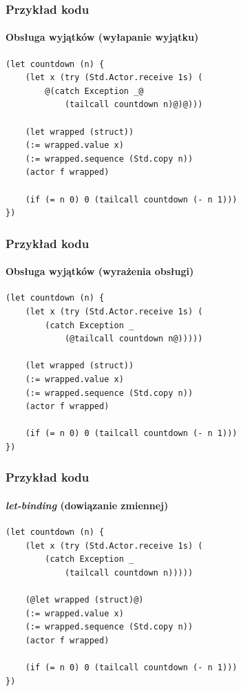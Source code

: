\documentclass[aspectratio=169]{beamer}
\begin{document}
\begin{frame}[fragile]
    \frametitle{Przykład kodu}
    \framesubtitle{Obsługa wyjątków (wyłapanie wyjątku)}

    \begin{small}
    \begin{lstlisting}
(let countdown (n) {
    (let x (try (Std.Actor.receive 1s) (
        @(catch Exception _@
            (tailcall countdown n)@)@)))

    (let wrapped (struct))
    (:= wrapped.value x)
    (:= wrapped.sequence (Std.copy n))
    (actor f wrapped)

    (if (= n 0) 0 (tailcall countdown (- n 1)))
})
    \end{lstlisting}
    \end{small}
\end{frame}

\begin{frame}[fragile]
    \frametitle{Przykład kodu}
    \framesubtitle{Obsługa wyjątków (wyrażenia obsługi)}

    \begin{small}
    \begin{lstlisting}
(let countdown (n) {
    (let x (try (Std.Actor.receive 1s) (
        (catch Exception _
            (@tailcall countdown n@)))))

    (let wrapped (struct))
    (:= wrapped.value x)
    (:= wrapped.sequence (Std.copy n))
    (actor f wrapped)

    (if (= n 0) 0 (tailcall countdown (- n 1)))
})
    \end{lstlisting}
    \end{small}
\end{frame}

\begin{frame}[fragile]
    \frametitle{Przykład kodu}
    \framesubtitle{\emph{let-binding} (dowiązanie zmiennej)}

    \begin{small}
    \begin{lstlisting}
(let countdown (n) {
    (let x (try (Std.Actor.receive 1s) (
        (catch Exception _
            (tailcall countdown n)))))

    (@let wrapped (struct)@)
    (:= wrapped.value x)
    (:= wrapped.sequence (Std.copy n))
    (actor f wrapped)

    (if (= n 0) 0 (tailcall countdown (- n 1)))
})
    \end{lstlisting}
    \end{small}
\end{frame}
\end{document}
